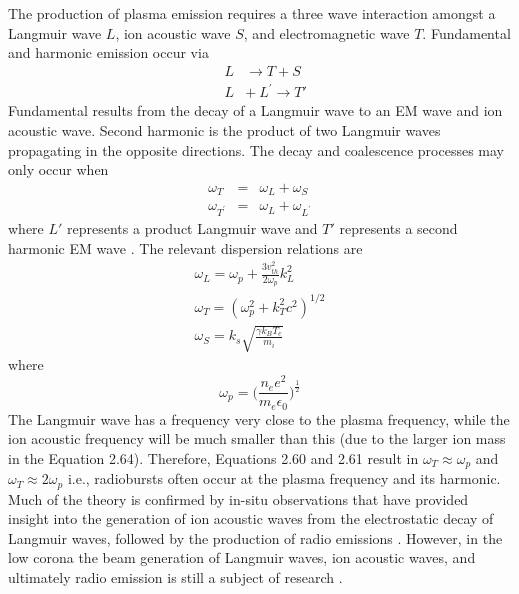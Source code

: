 
The production of plasma emission requires a three wave interaction amongst a Langmuir wave $L$, ion acoustic wave $S$, and electromagnetic wave $T$. Fundamental and harmonic emission occur via 
\begin{eqnarray}
&L& \rightarrow T + S \\
&L& + ~L^{'}\rightarrow T'
\end{eqnarray}
Fundamental results from the decay of a Langmuir wave to an EM wave and ion acoustic wave. Second harmonic is the product of two Langmuir waves propagating in the opposite directions. The decay and coalescence processes may only occur when
\begin{eqnarray}
\omega_T & = & \omega_L + \omega_S \\
\omega_{T^{'}} & = & \omega_L + \omega_{L^{'}}
\end{eqnarray}
where $L'$ represents a product Langmuir wave and $T'$ represents a second harmonic EM wave \citep{robinson1994}. The relevant dispersion relations are 
\begin{eqnarray}
\omega_L = \omega_p + \frac{3v_{th}^2}{2\omega_p}k_L^2 \\
\omega_T = (\omega_p^2 +k_T^2c^2)^{1/2} \\
\omega_S = k_s\sqrt{\frac{\gamma k_B T_e}{m_i}}
\end{eqnarray}
where
\begin{equation}
\omega_p = \bigg(\frac{n_e e^2}{m_e \epsilon_0}\bigg)^\frac{1}{2}
\label{eqn:plasma_frequency}
\end{equation}
The Langmuir wave has a frequency very close to the plasma frequency, while the ion acoustic frequency will be much smaller than this (due to the larger ion mass in the Equation 2.64). Therefore, Equations 2.60 and 2.61 result in $\omega_T \approx \omega_p$ and $\omega_T\approx 2\omega_p$ i.e., radiobursts often occur at the plasma frequency and its harmonic. Much of the theory is confirmed by in-situ observations that have provided insight into the generation of ion acoustic waves from the electrostatic decay of Langmuir waves, followed by the production of radio emissions \citep{thejappa1998}. However, in the low corona the beam generation of Langmuir waves, ion acoustic waves, and ultimately radio emission is still a subject of research \citep{kontar2001, reid2010, ratcliffe2012}.
